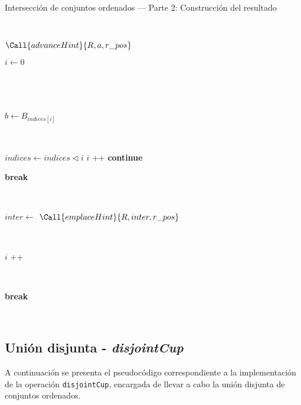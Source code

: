 \begin{algorithm}
\caption{Intersección de conjuntos ordenados — Parte 2: Construcción del resultado}
\begin{algorithmic}[1]
            
    \
    
        \State $\Call{advanceHint}{R,a,r\_pos}$

        \State $i \gets 0$
                
    \
    
                
    \
    
            \State $b \gets B_{indices[i]}$
        
    \
    
                \State $indices \gets indices 	\triangleleft  i$
                 \State $i$ \!+\!+ 
                \State \textbf{continue}
            \EndIf

                \State \textbf{break}
            \EndIf

\
            
                \State $inter \gets$ 
                    \State $\Call{emplaceHint}{R,inter,r\_pos}$
                \EndIf
            \EndIf
        
    \
    
            \State $i$ \!+\!+ 
        \EndWhile
        
    \
    
            \State \textbf{break}
        \EndIf
    \EndFor
            
    \
    
    \State {}
\EndFunction
\end{algorithmic}
\end{algorithm}



\newpage
\subsection{Unión disjunta - \textit{disjointCup}}

A continuación se presenta el pseudocódigo correspondiente a la implementación de la operación \texttt{disjointCup}, encargada de llevar a cabo la unión disjunta de conjuntos ordenados. 

